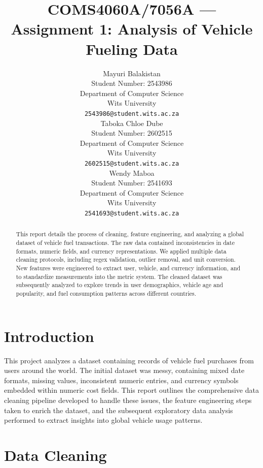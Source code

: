 \documentclass{article}
\title{COMS4060A/7056A --- Assignment 1: Analysis of Vehicle Fueling Data}
\author{%
  Mayuri Balakistan \\
  Student Number: 2543986\\
  Department of Computer Science\\
  Wits University\\
  \texttt{2543986@student.wits.ac.za} \\
  \And
  Taboka Chloe Dube \\
  Student Number: 2602515\\
  Department of Computer Science \\
  Wits University \\
\texttt{2602515@student.wits.ac.za} \\
  \And
  Wendy Maboa \\
  Student Number: 2541693\\
  Department of Computer Science \\
  Wits University \\
\texttt{2541693@student.wits.ac.za} \\
}
\begin{document}
\maketitle

\begin{abstract}
This report details the process of cleaning, feature engineering, and analyzing a global dataset of vehicle fuel transactions. The raw data contained inconsistencies in date formats, numeric fields, and currency representations. We applied multiple data cleaning protocols, including regex validation, outlier removal, and unit conversion. New features were engineered to extract user, vehicle, and currency information, and to standardize measurements into the metric system. The cleaned dataset was subsequently analyzed to explore trends in user demographics, vehicle age and popularity, and fuel consumption patterns across different countries. 
\end{abstract}

\section{Introduction}
 This project analyzes a dataset containing records of vehicle fuel purchases from users around the world. The initial dataset was messy, containing mixed date formats, missing values, inconsistent numeric entries, and currency symbols embedded within numeric cost fields. This report outlines the comprehensive data cleaning pipeline developed to handle these issues, the feature engineering steps taken to enrich the dataset, and the subsequent exploratory data analysis performed to extract insights into global vehicle usage patterns.

\section{Data Cleaning}
\end{document}
